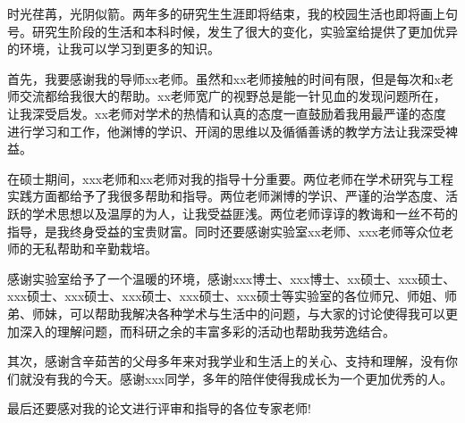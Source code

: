 ﻿%
时光荏苒，光阴似箭。两年多的研究生生涯即将结束，我的校园生活也即将画上句号。研究生阶段的生活和本科时候，发生了很大的变化，实验室给提供了更加优异的环境，让我可以学习到更多的知识。

首先，我要感谢我的导师xx老师。虽然和xx老师接触的时间有限，但是每次和x老师交流都给我很大的帮助。xx老师宽广的视野总是能一针见血的发现问题所在，让我深受启发。xx老师对学术的热情和认真的态度一直鼓励着我用最严谨的态度进行学习和工作，他渊博的学识、开阔的思维以及循循善诱的教学方法让我深受裨益。

在硕士期间，xxx老师和xx老师对我的指导十分重要。两位老师在学术研究与工程实践方面都给予了我很多帮助和指导。两位老师渊博的学识、严谨的治学态度、活跃的学术思想以及温厚的为人，让我受益匪浅。两位老师谆谆的教诲和一丝不苟的指导，是我终身受益的宝贵财富。同时还要感谢实验室xx老师、xxx老师等众位老师的无私帮助和辛勤栽培。

感谢实验室给予了一个温暖的环境，感谢xxx博士、xxx博士、xx硕士、xxx硕士、xxx硕士、xxx硕士、xxx硕士、xxx硕士、xxx硕士等实验室的各位师兄、师姐、师弟、师妹，可以帮助我解决各种学术与生活中的问题，与大家的讨论使得我可以更加深入的理解问题，而科研之余的丰富多彩的活动也帮助我劳逸结合。

其次，感谢含辛茹苦的父母多年来对我学业和生活上的关心、支持和理解，没有你们就没有我的今天。感谢xxx同学，多年的陪伴使得我成长为一个更加优秀的人。

最后还要感对我的论文进行评审和指导的各位专家老师!